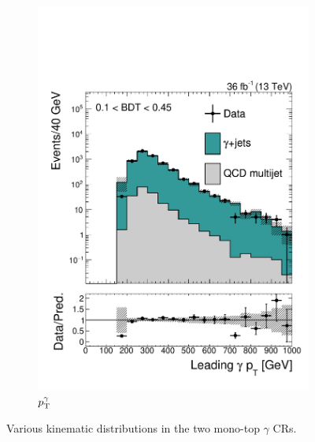 \begin{figure}[]
\begin{center}
\begin{subfigure}[t]{0.32\textwidth}
            \includegraphics[width=\textwidth]{figures/monotop/prefit/photon_loose_loosePho1Pt_logy.pdf}
            \caption{$p_\mathrm{T}^\gamma$}
        \end{subfigure}
        \caption{Various kinematic distributions in the two mono-top $\gamma$ CRs. }
        \label{fig:mt:prefit_photon}
    \end{center}
\end{figure}

